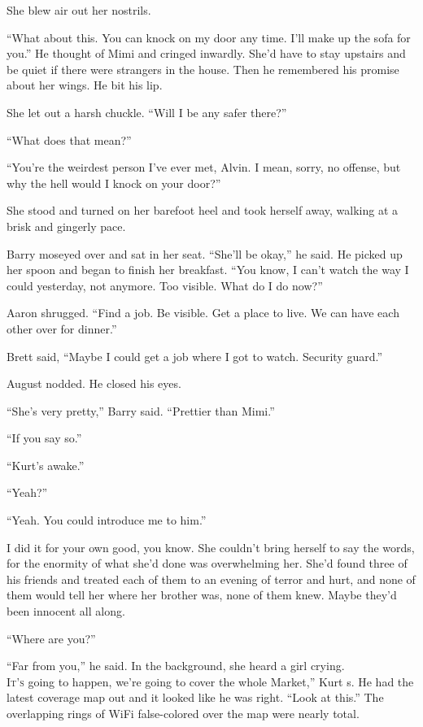 She blew air out her nostrils. 

``What about this.  You can knock on my door any time.  I'll make up
the sofa for you.'' He thought of Mimi and cringed inwardly.  She'd
have to stay upstairs and be quiet if there were strangers in the
house.  Then he remembered his promise about her wings.  He bit his
lip.

She let out a harsh chuckle.  ``Will I be any safer there?''

``What does that mean?''

``You're the weirdest person I've ever met, Alvin.  I mean, sorry, no
offense, but why the hell would I knock on your door?''

She stood and turned on her barefoot heel and took herself away,
walking at a brisk and gingerly pace.

Barry moseyed over and sat in her seat.  ``She'll be okay,'' he said. 
He picked up her spoon and began to finish her breakfast.  ``You know,
I can't watch the way I could yesterday, not anymore.  Too visible. 
What do I do now?''

Aaron shrugged.  ``Find a job.  Be visible.  Get a place to live.  We
can have each other over for dinner.''

Brett said, ``Maybe I could get a job where I got to watch.  Security
guard.''

August nodded.  He closed his eyes.

``She's very pretty,'' Barry said.  ``Prettier than Mimi.''

``If you say so.''

``Kurt's awake.''

``Yeah?''

``Yeah.  You could introduce me to him.''

I did it for your own good, you know.  She couldn't bring herself to
say the words, for the enormity of what she'd done was overwhelming
her.  She'd found three of his friends and treated each of them to an
evening of terror and hurt, and none of them would tell her where her
brother was, none of them knew.  Maybe they'd been innocent all along.

``Where are you?''

``Far from you,'' he said.  In the background, she heard a girl
crying.
\\
\lettrine[lines=3, lhang=.5, nindent=0pt, findent=2pt]{I}{t's}
going to happen, we're going to cover the whole Market,'' Kurt
s.  He had the latest coverage map out and it looked like he was
right.  ``Look at this.'' The overlapping rings of WiFi false-colored
over the map were nearly total. 

